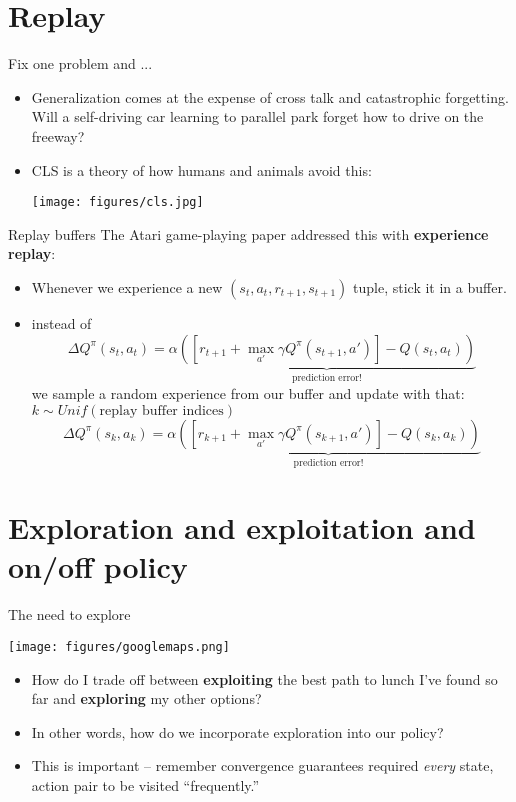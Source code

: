 \documentclass{beamer}
\begin{document}
\section{Replay}
\begin{frame}{Fix one problem and ...}
\begin{itemize}
    \item Generalization comes at the expense of cross talk and catastrophic forgetting. Will a self-driving car learning to parallel park forget how to drive on the freeway?
    \item<2-> CLS is a theory of how humans and animals avoid this:
    \begin{center}
        \texttt{[image: figures/cls.jpg]}
    \end{center}
\end{itemize}
\end{frame}

\begin{frame}{Replay buffers}
The Atari game-playing paper addressed this with \textbf{experience replay}:
\begin{itemize}
    \item Whenever we experience a new \((s_t, a_t, r_{t+1}, s_{t+1})\) tuple, stick it in a buffer.
    \item<2-> instead of  
         {
          \[\Delta Q^{\pi}(s_{t}, a_t) = \alpha \underbrace{\left( \left[ r_{t+1} + \max_{a'} \gamma Q^{\pi}(s_{t+1}, a') \right] - Q(s_t, a_t)\right)}_{\text{prediction error!}}\]}%
        we sample a random experience from our buffer and update with that: \(k \sim Unif(\text{replay buffer indices})\) 
         {
          \[\Delta Q^{\pi}(s_{k}, a_k) = \alpha \underbrace{\left( \left[ r_{k+1} + \max_{a'} \gamma Q^{\pi}(s_{k+1}, a') \right] - Q(s_k, a_k)\right)}_{\text{prediction error!}}\]}


\end{itemize}
\end{frame}

\section{Exploration and exploitation and on/off policy}
\begin{frame}{The need to explore}
\begin{center}
    \texttt{[image: figures/googlemaps.png]}
\end{center}
\begin{itemize}
    \item<2-> How do I trade off between \textbf{exploiting} the best path to lunch I've found so far and \textbf{exploring} my other options?
    \item<3-> In other words, how do we incorporate exploration into our policy?
    \item<4-> This is important -- remember convergence guarantees required \emph{every} state, action pair to be visited ``frequently.''
\end{itemize}
\end{frame}
\end{document}
